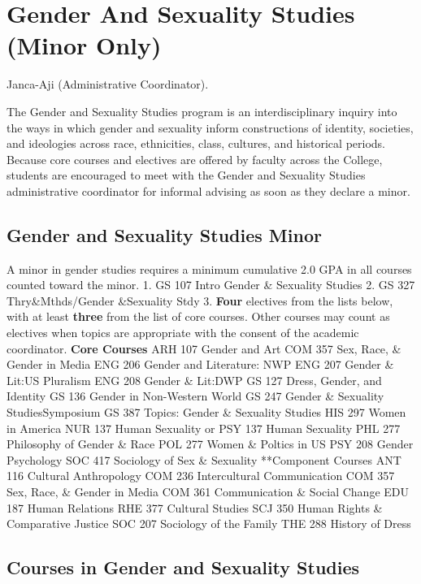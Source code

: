 \documentclass[
  letterpaper,
]{scrbook}
\begin{document}
\hypertarget{sec-gender-and-sexuality-studies}{%
\section{Gender And Sexuality Studies (Minor
Only)}\label{sec-gender-and-sexuality-studies}}

Janca-Aji (Administrative Coordinator).

The Gender and Sexuality Studies program is an interdisciplinary inquiry
into the ways in which gender and sexuality inform constructions of
identity, societies, and ideologies across race, ethnicities, class,
cultures, and historical periods. Because core courses and electives are
offered by faculty across the College, students are encouraged to meet
with the Gender and Sexuality Studies administrative coordinator for
informal advising as soon as they declare a minor.

\hypertarget{gender-and-sexuality-studies-minor}{%
\subsection{Gender and Sexuality Studies
Minor}\label{gender-and-sexuality-studies-minor}}

A minor in gender studies requires a minimum cumulative 2.0 GPA in all
courses counted toward the minor. 1. GS 107 Intro Gender \& Sexuality
Studies 2. GS 327 Thry\&Mthds/Gender \&Sexuality Stdy 3. \textbf{Four}
electives from the lists below, with at least \textbf{three} from the
list of core courses. Other courses may count as electives when topics
are appropriate with the consent of the academic coordinator.
\textbf{Core Courses} ARH 107 Gender and Art COM 357 Sex, Race, \&
Gender in Media ENG 206 Gender and Literature: NWP ENG 207 Gender \&
Lit:US Pluralism ENG 208 Gender \& Lit:DWP GS 127 Dress, Gender, and
Identity GS 136 Gender in Non-Western World GS 247 Gender \& Sexuality
StudiesSymposium GS 387 Topics: Gender \& Sexuality Studies HIS 297
Women in America NUR 137 Human Sexuality or PSY 137 Human Sexuality PHL
277 Philosophy of Gender \& Race POL 277 Women \& Poltics in US PSY 208
Gender Psychology SOC 417 Sociology of Sex \& Sexuality **Component
Courses ANT 116 Cultural Anthropology COM 236 Intercultural
Communication COM 357 Sex, Race, \& Gender in Media COM 361
Communication \& Social Change EDU 187 Human Relations RHE 377 Cultural
Studies SCJ 350 Human Rights \& Comparative Justice SOC 207 Sociology of
the Family THE 288 History of Dress

\hypertarget{courses-in-gender-and-sexuality-studies}{%
\subsection{Courses in Gender and Sexuality
Studies}\label{courses-in-gender-and-sexuality-studies}}
\end{document}
